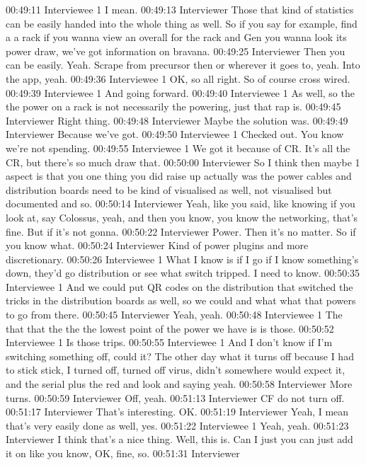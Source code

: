 00:49:11 Interviewee 1
I mean.
00:49:13 Interviewer
Those that kind of statistics can be easily handed into the whole thing as well. So if you say for example, find a a rack if you wanna view an overall for the rack and Gen you wanna look its power draw, we've got information on bravana.
00:49:25 Interviewer
Then you can be easily. Yeah. Scrape from precursor then or wherever it goes to, yeah. Into the app, yeah.
00:49:36 Interviewee 1
OK, so all right. So of course cross wired.
00:49:39 Interviewee 1
And going forward.
00:49:40 Interviewee 1
As well, so the the power on a rack is not necessarily the powering, just that rap is.
00:49:45 Interviewer
Right thing.
00:49:48 Interviewer
Maybe the solution was.
00:49:49 Interviewer
Because we've got.
00:49:50 Interviewee 1
Checked out. You know we're not spending.
00:49:55 Interviewee 1
We got it because of CR. It's all the CR, but there's so much draw that.
00:50:00 Interviewer
So I think then maybe 1 aspect is that you one thing you did raise up actually was the power cables and distribution boards need to be kind of visualised as well, not visualised but documented and so.
00:50:14 Interviewer
Yeah, like you said, like knowing if you look at, say Colossus, yeah, and then you know, you know the networking, that's fine. But if it's not gonna.
00:50:22 Interviewer
Power. Then it's no matter. So if you know what.
00:50:24 Interviewer
Kind of power plugins and more discretionary.
00:50:26 Interviewee 1
What I know is if I go if I know something's down, they'd go distribution or see what switch tripped. I need to know.
00:50:35 Interviewee 1
And we could put QR codes on the distribution that switched the tricks in the distribution boards as well, so we could and what what that powers to go from there.
00:50:45 Interviewer
Yeah, yeah.
00:50:48 Interviewee 1
The that that the the the lowest point of the power we have is is those.
00:50:52 Interviewee 1
Is those trips.
00:50:55 Interviewee 1
And I don't know if I'm switching something off, could it? The other day what it turns off because I had to stick stick, I turned off, turned off virus, didn't somewhere would expect it, and the serial plus the red and look and saying yeah.
00:50:58 Interviewer
More turns.
00:50:59 Interviewer
Off, yeah.
00:51:13 Interviewer
CF do not turn off.
00:51:17 Interviewer
That's interesting. OK.
00:51:19 Interviewer
Yeah, I mean that's very easily done as well, yes.
00:51:22 Interviewee 1
Yeah, yeah.
00:51:23 Interviewer
I think that's a nice thing. Well, this is. Can I just you can just add it on like you know, OK, fine, so.
00:51:31 Interviewer
